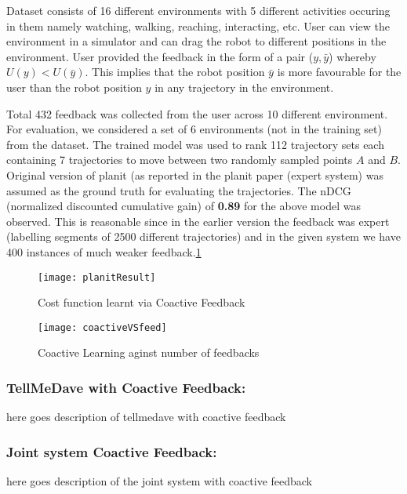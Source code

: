 		Dataset consists of 16 different environments with 5 different activities occuring in them namely watching, walking, reaching, interacting, etc. User can view the environment in a simulator and can drag the robot to different positions in the environment. User provided the feedback in the form of a pair ($y,\bar{y}$) whereby $U(y) < U(\bar{y})$. This implies that the robot position $\bar{y}$ is more favourable for the user than the robot position $y$ in any trajectory in the environment. 

		Total 432 feedback was collected from the user across 10 different environment. For evaluation, we considered a set of 6 environments (not in the training set) from the dataset. The trained model was used to rank 112 trajectory sets each containing 7 trajectories to move between two randomly sampled points $A$ and $B$. Original version of planit (as reported in the planit paper (expert system) was assumed as the ground truth for evaluating the trajectories. The nDCG (normalized discounted cumulative gain) of \textbf{0.89} for the above model was observed. This is reasonable since in the earlier version the feedback was expert (labelling segments of 2500 different trajectories) and in the given system we have 400 instances of much weaker feedback.\ref{fig:planitResult} 


		\begin{figure}[h]
		\texttt{[image: planitResult]}
		\centering
		\caption{Cost function learnt via Coactive Feedback}
  		\label{fig:planitResult}
		\end{figure}


		\begin{figure}[h]
		\texttt{[image: coactiveVSfeed]}
		\centering
		\caption{Coactive Learning aginst number of feedbacks}
  		\label{fig:c1}
		\end{figure}
	\subsubsection{TellMeDave with Coactive Feedback:} 
		here goes description of tellmedave with coactive feedback

	\subsubsection{Joint system Coactive Feedback:}
		here goes description of the joint system with coactive feedback


